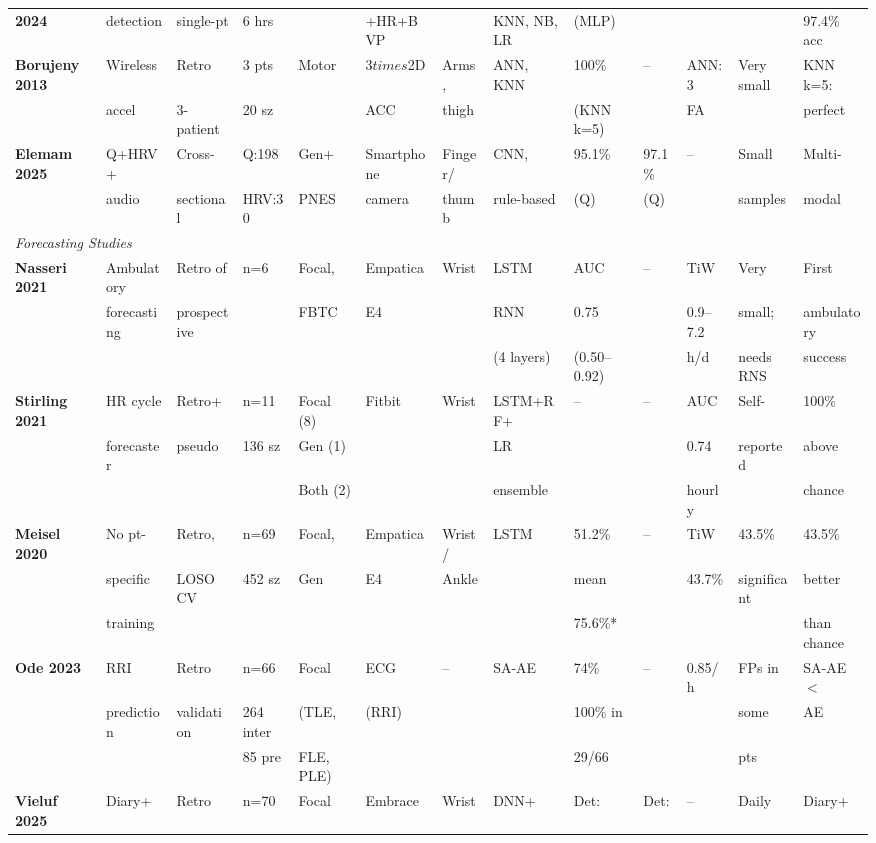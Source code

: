 \begin{table}[htbp]
\begin{tabular}{p{2.8cm}p{1.8cm}p{1.6cm}p{1.4cm}p{1.5cm}p{1.6cm}p{1.4cm}p{1.2cm}p{1.4cm}p{1.4cm}p{1.2cm}p{1.6cm}p{2.2cm}}
\textbf{2024} & detection & single-pt & 6 hrs & & +HR+BVP & & KNN, NB, LR & (MLP) & & & & 97.4\% acc \\[4pt]
\textbf{Borujeny 2013} & Wireless & Retro & 3 pts & Motor & 3$times$2D & Arms, & ANN, KNN & 100\% & -- & ANN: 3 & Very small & KNN k=5: \\
& accel & 3-patient & 20 sz & & ACC & thigh & & (KNN k=5) & & FA & & perfect \\[4pt]
\textbf{Elemam 2025} & Q+HRV+ & Cross- & Q:198 & Gen+ & Smartphone & Finger/ & CNN, & 95.1\% & 97.1\% & -- & Small & Multi- \\
& audio & sectional & HRV:30 & PNES & camera & thumb & rule-based & (Q) & (Q) & & samples & modal \\[4pt]
\multicolumn{13}{l}{\textit{Forecasting Studies}} \\[4pt]
\textbf{Nasseri 2021} & Ambulatory & Retro of & n=6 & Focal, & Empatica & Wrist & LSTM & AUC & -- & TiW & Very & First \\
& forecasting & prospective & & FBTC & E4 & & RNN & 0.75 & & 0.9--7.2 & small; & ambulatory \\
& & & & & & & (4 layers) & (0.50--0.92) & & h/d & needs RNS & success \\[4pt]
\textbf{Stirling 2021} & HR cycle & Retro+ & n=11 & Focal (8) & Fitbit & Wrist & LSTM+RF+ & -- & -- & AUC & Self- & 100\% \\
& forecaster & pseudo & 136 sz & Gen (1) & & & LR & & & 0.74 & reported & above \\
& & & & Both (2) & & & ensemble & & & hourly & & chance \\[4pt]
\textbf{Meisel 2020} & No pt- & Retro, & n=69 & Focal, & Empatica & Wrist/ & LSTM & 51.2\% & -- & TiW & 43.5\% & 43.5\% \\
& specific & LOSO CV & 452 sz & Gen & E4 & Ankle & & mean & & 43.7\% & significant & better \\
& training & & & & & & & 75.6\%* & & & & than chance \\[4pt]
\textbf{Ode 2023} & RRI & Retro & n=66 & Focal & ECG & -- & SA-AE & 74\% & -- & 0.85/h & FPs in & SA-AE $<$ \\
& prediction & validation & 264 inter & (TLE, & (RRI) & & & 100\% in & & & some & AE \\
& & & 85 pre & FLE, PLE) & & & & 29/66 & & & pts & \\[4pt]
\textbf{Vieluf 2025} & Diary+ & Retro & n=70 & Focal & Embrace & Wrist & DNN+ & Det: & Det: & -- & Daily & Diary+ \\

\end{tabular}
\end{table}
